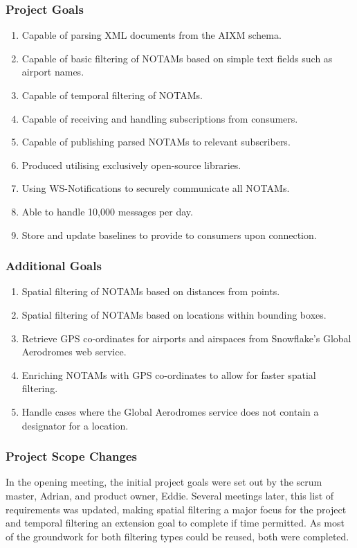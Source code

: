 \documentclass[a4paper, 12pt, twoside]{article}
\begin{document}
\subsubsection{Project Goals}
\begin{enumerate}
\item Capable of parsing XML documents from the AIXM schema.
\item Capable of basic filtering of NOTAMs based on simple text fields such as airport names.
\item Capable of temporal filtering of NOTAMs.
\item Capable of receiving and handling subscriptions from consumers.
\item Capable of publishing parsed NOTAMs to relevant subscribers.
\item Produced utilising exclusively open-source libraries.
\item Using WS-Notifications to securely communicate all NOTAMs.
\item Able to handle 10,000 messages per day.
\item Store and update baselines to provide to consumers upon connection.
\end{enumerate}

\subsubsection{Additional Goals}
\begin{enumerate}
\item Spatial filtering of NOTAMs based on distances from points.
\item Spatial filtering of NOTAMs based on locations within bounding boxes.
\item Retrieve GPS co-ordinates for airports and airspaces from Snowflake's Global Aerodromes web service.
\item Enriching NOTAMs with GPS co-ordinates to allow for faster spatial filtering.
\item Handle cases where the Global Aerodromes service does not contain a designator for a location.
\end{enumerate}

\subsubsection{Project Scope Changes}
In the opening meeting, the initial project goals were set out by the scrum master, Adrian, and product owner, Eddie. Several meetings later, this list of requirements was updated, making spatial filtering a major focus for the project and temporal filtering an extension goal to complete if time permitted. As most of the groundwork for both filtering types could be reused, both were completed.
\end{document}
